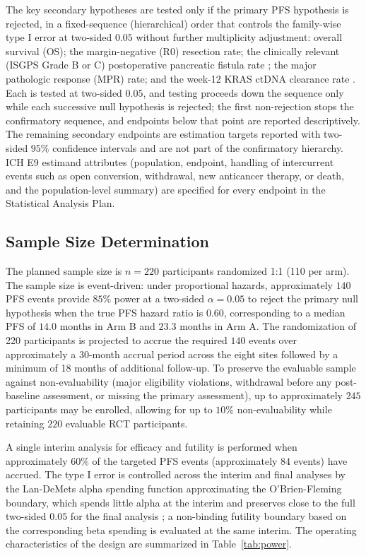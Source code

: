 The key secondary hypotheses are tested only if the primary PFS hypothesis is
rejected, in a fixed-sequence (hierarchical) order that controls the family-wise type
I error at two-sided $0.05$ without further multiplicity adjustment: overall survival
(OS); the margin-negative (R0) resection rate; the clinically relevant (ISGPS Grade B
or C) postoperative pancreatic fistula rate \cite{Bassi2017}; the major pathologic
response (MPR) rate; and the week-12 KRAS ctDNA clearance rate \cite{Tie2019ctdna}.
Each is tested at two-sided $0.05$, and testing proceeds down the sequence only while
each successive null hypothesis is rejected; the first non-rejection stops the
confirmatory sequence, and endpoints below that point are reported descriptively. The
remaining secondary endpoints are estimation targets reported with two-sided $95\%$
confidence intervals and are not part of the confirmatory hierarchy. ICH E9 estimand
attributes (population, endpoint, handling of intercurrent events such as open
conversion, withdrawal, new anticancer therapy, or death, and the population-level
summary) are specified for every endpoint in the Statistical Analysis Plan.

\subsection{Sample Size Determination}

The planned sample size is $n=220$ participants randomized 1:1 (110 per arm). The
sample size is event-driven: under proportional hazards, approximately $140$ PFS
events provide $85\%$ power at a two-sided $\alpha = 0.05$ to reject the primary null
hypothesis when the true PFS hazard ratio is $0.60$, corresponding to a median PFS of
$14.0$ months in Arm B and $23.3$ months in Arm A. The randomization of 220
participants is projected to accrue the required $140$ events over approximately a
30-month accrual period across the eight sites followed by a minimum of 18 months of
additional follow-up. To preserve the evaluable sample against non-evaluability
(major eligibility violations, withdrawal before any post-baseline assessment, or
missing the primary assessment), up to approximately $245$ participants may be
enrolled, allowing for up to $10\%$ non-evaluability while retaining $220$ evaluable RCT participants.

\clearpage

A single interim analysis for efficacy and futility is performed when approximately
$60\%$ of the targeted PFS events (approximately $84$ events) have accrued. The type
I error is controlled across the interim and final analyses by the Lan-DeMets alpha
spending function approximating the O'Brien-Fleming boundary, which spends little
alpha at the interim and preserves close to the full two-sided $0.05$ for the final
analysis \cite{DeMets1994lan,Jennison2000group}; a non-binding futility boundary
based on the corresponding beta spending is evaluated at the same interim. The
operating characteristics of the design are summarized in Table~\ref{tab:power}.

